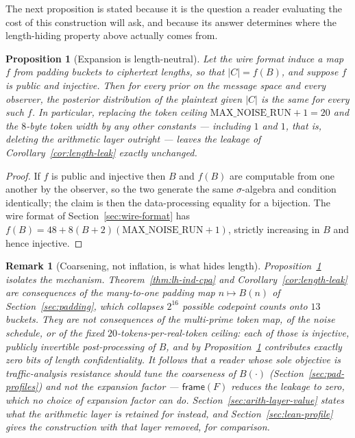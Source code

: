 \documentclass[11pt,a4paper]{article}
\newtheorem{proposition}[theorem]{Proposition}
\newtheorem{remark}[theorem]{Remark}
\begin{document}
The next proposition is stated because it is the question a reader
evaluating the cost of this construction will ask, and because its answer
determines where the length-hiding property above actually comes from.

\begin{proposition}[Expansion is length-neutral]\label{prop:expansion-neutral}
Let the wire format induce a map $f$ from padding buckets to ciphertext
lengths, so that $|C|=f(B)$, and suppose $f$ is public and injective. Then
for every prior on the message space and every observer, the posterior
distribution of the plaintext given $|C|$ is the same for every such $f$.
In particular, replacing the token ceiling
$\mathrm{MAX\_NOISE\_RUN}+1=20$ and the $8$-byte token width by \emph{any}
other constants — including $1$ and $1$, that is, deleting the arithmetic
layer outright — leaves the leakage of Corollary~\ref{cor:length-leak}
exactly unchanged.
\end{proposition}

\begin{proof}
If $f$ is public and injective then $B$ and $f(B)$ are computable from one
another by the observer, so the two generate the same $\sigma$-algebra and
condition identically; the claim is then the data-processing equality for a
bijection. The wire format of Section~\ref{sec:wire-format} has
$f(B)=48+8(B+2)(\mathrm{MAX\_NOISE\_RUN}+1)$, strictly increasing in $B$
and hence injective.
\end{proof}

\begin{remark}[Coarsening, not inflation, is what hides length]
\label{rem:coarsening-not-inflation}
Proposition~\ref{prop:expansion-neutral} isolates the mechanism.
Theorem~\ref{thm:lh-ind-cpa} and Corollary~\ref{cor:length-leak} are
consequences of the \emph{many-to-one} padding map $n\mapsto B(n)$ of
Section~\ref{sec:padding}, which collapses $2^{16}$ possible codepoint
counts onto $13$ buckets. They are \emph{not} consequences of the
multi-prime token map, of the noise schedule, or of the fixed
$20$-tokens-per-real-token ceiling: each of those is injective, publicly
invertible post-processing of
$B$, and by Proposition~\ref{prop:expansion-neutral} contributes exactly
zero bits of length confidentiality. It follows that a reader whose sole
objective is traffic-analysis resistance should tune the coarseness of
$B(\cdot)$ (Section~\ref{sec:pad-profiles}) and not the expansion factor —
$\mathsf{frame}(F)$ reduces the leakage to zero, which no choice of
expansion factor can do. Section~\ref{sec:arith-layer-value} states what
the arithmetic layer is retained for instead, and
Section~\ref{sec:lean-profile} gives the construction with that layer
removed, for comparison.
\end{remark}
\end{document}
